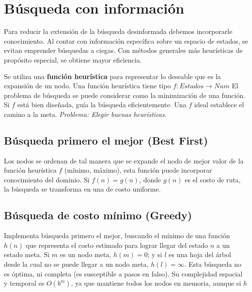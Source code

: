 \section{Búsqueda con información}
Para reducir la extensión de la búsqueda desinformada debemos incorporarle
conocimiento. Al contar con información específica sobre un espacio de estados,
se evitan emprender búsquedas a ciegas. Con métodos generales más heurísticas
de propósito especial, se obtiene mayor eficiencia.

Se utiliza una \textbf{función heurística} para representar lo deseable que es
la expansión de un nodo. Una función heurística tiene tipo $f : Estados \to Num$
El problema de búsqueda se puede considerar como la minimización de una función.
Si $f$ está bien diseñada, guía la búsqueda eficientemente. Una $f$ ideal
establece el camino a la meta. \textit{Problema: Elegir buenas heurísticas}.

\subsection{Búsqueda primero el mejor (Best First)}
Los nodos se ordenan de tal manera que se expande el nodo de mejor valor de la
función heurística $f$ (mínimo, máximo), esta función puede incorporar
conocimiento del dominio. Si $f(n) = g(n)$, donde $g(n)$ es el costo de ruta,
la búsqueda se transforma en una de costo uniforme.

\subsection{Búsqueda de costo mínimo (Greedy)}
Implementa búsqueda primero el mejor, buscando el mínimo de una función $h(n)$
que representa el costo estimado para lograr llegar del estado $n$ a un estado
meta. Si $m$ es un nodo meta, $h(m) = 0$; y si $l$ es una hoja del árbol desde
la cual no se puede llegar a un nodo meta, $h(l) = \infty$. Esta búsqueda no 
es óptima, ni completa (es susceptible a pasos en falso). Su complejidad
espacial y temporal es $O(b^m)$, ya que mantiene todos los nodos en memoria,
aunque si $h$





